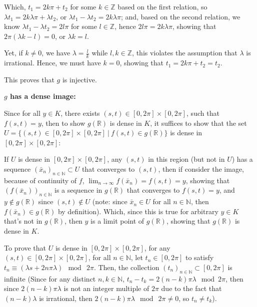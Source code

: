 \documentclass{article}
\begin{document}
\begin{itemize}
    Which, $t_1 = 2k\pi + t_2$ for some $k\in\mathbb{Z}$ based on the first relation, so $\lambda t_1 = 2k\lambda \pi + \lambda t_2$, or $\lambda t_1-\lambda t_2 = 2k\lambda \pi$;
    and, based on the second relation, we know $\lambda t_1 - \lambda t_2 = 2l\pi$ for some $l\in\mathbb{Z}$, hence $2l\pi = 2k\lambda \pi$, showing that $2\pi (\lambda k-l)=0$, or $\lambda k=l$.

    Yet, if $k\neq 0$, we have $\lambda = \frac{l}{k}$ while $l,k\in\mathbb{Z}$, this violates the assumption that $\lambda$ is irrational. Hence, we must have $k=0$, showing that $t_1 = 2k\pi + t_2 = t_2$.

    This proves that $g$ is injective.

    \hfil

    \textbf{$g$ has a dense image:}

    Since for all $y\in K$, there exists $(s,t)\in [0,2\pi]\times [0,2\pi]$, such that $f(s,t)=y$, then to show $g(\mathbb{R})$ is dense in $K$, it suffices to show that the set $U=\{(s,t)\in [0,2\pi]\times [0,2\pi]\ |\ f(s,t)\in g(\mathbb{R})\}$ is dense in $[0,2\pi]\times [0,2\pi]$:
    
    If $U$ is dense in $[0,2\pi]\times [0,2\pi]$, any $(s,t)$ in this region (but not in $U$) has a sequence $(\bar{x}_n)_{n\in\mathbb{N}}\subset U$ that converges to $(s,t)$, then if consider the image, because of continuity of $f$, $\lim_{n\rightarrow\infty}f(\bar{x}_n) = f(s,t)=y$, showing that $(f(\bar{x}_n))_{n\in\mathbb{N}}$
    is a sequence in $g(\mathbb{R})$ that converges to $f(s,t)=y$, and $y\notin g(\mathbb{R})$ since $(s,t)\notin U$ (note: since $\bar{x}_n\in U$ for all $n\in\mathbb{N}$, then $f(\bar{x}_n)\in g(\mathbb{R})$ by definition).
    Which, since this is true for arbitrary $y\in K$ that's not in $g(\mathbb{R})$, then $y$ is a limit point of $g(\mathbb{R})$, showing that $g(\mathbb{R})$ is dense in $K$.

    \hfil

    To prove that $U$ is dense in $[0,2\pi]\times [0,2\pi]$, for any $(s,t)\in [0,2\pi]\times [0,2\pi]$, for all $n\in\mathbb{N}$, let $t_n\in [0,2\pi]$ to satisfy $t_n \equiv (\lambda s+2n\pi \lambda)\mod\ 2\pi$. Then, the collection $(t_n)_{n\in\mathbb{N}}\subset [0,2\pi]$ is infinite 
    (Since for any distinct $n,k\in\mathbb{N}$, $t_n - t_k = 2(n-k)\pi\lambda \mod 2\pi$, then since $2(n-k)\pi\lambda$ is not an integer multiple of $2\pi$ due to the fact that $(n-k)\lambda$ is irrational, then $2(n-k)\pi\lambda\mod\ 2\pi\neq 0$, so $t_n\neq t_k$).


\end{itemize}
\end{document}
